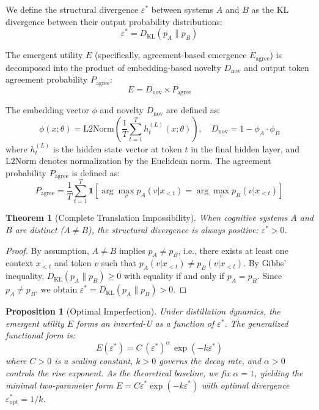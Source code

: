 \documentclass[11pt,a4paper]{article}
\newtheorem{theorem}{Theorem}
\newtheorem{proposition}{Proposition}
\begin{document}
We define the structural divergence $\varepsilon^*$ between systems $A$ and $B$ as the KL
divergence \cite{cover2006} between their output probability distributions:
\[
\varepsilon^* = D_\mathrm{KL}(p_A \| p_B)
\]

The emergent utility $E$ (specifically, agreement-based emergence $E_\mathrm{agree}$) is
decomposed into the product of embedding-based novelty $D_\mathrm{nov}$ and output token
agreement probability $P_\mathrm{agree}$:
\[
E = D_\mathrm{nov} \times P_\mathrm{agree}
\]

The embedding vector $\phi$ and novelty $D_\mathrm{nov}$ are defined as:
\[
\phi(x;\theta) = \mathrm{L2Norm}\!\left(\frac{1}{T}\sum_{t=1}^{T} h_t^{(L)}(x;\theta)\right),
\quad D_\mathrm{nov} = 1 - \phi_A \cdot \phi_B
\]
where $h_t^{(L)}$ is the hidden state vector at token $t$ in the final hidden layer, and
$\mathrm{L2Norm}$ denotes normalization by the Euclidean norm. The agreement probability
$P_\mathrm{agree}$ is defined as:
\[
P_\mathrm{agree} = \frac{1}{T}\sum_{t=1}^{T}
\mathbf{1}\!\left[\arg\max_v p_A(v|x_{<t}) = \arg\max_v p_B(v|x_{<t})\right]
\]

\begin{theorem}[Complete Translation Impossibility]
When cognitive systems $A$ and $B$ are distinct ($A \neq B$), the structural divergence is
always positive: $\varepsilon^* > 0$.
\end{theorem}

\begin{proof}
By assumption, $A \neq B$ implies $p_A \neq p_B$, i.e., there exists at least one context
$x_{<t}$ and token $v$ such that $p_A(v|x_{<t}) \neq p_B(v|x_{<t})$. By Gibbs' inequality,
$D_\mathrm{KL}(p_A \| p_B) \geq 0$ with equality if and only if $p_A = p_B$. Since
$p_A \neq p_B$, we obtain $\varepsilon^* = D_\mathrm{KL}(p_A \| p_B) > 0$.
\end{proof}

\begin{proposition}[Optimal Imperfection]\label{prop:optimal}
Under distillation dynamics, the emergent utility $E$ forms an inverted-U as a function of
$\varepsilon^*$. The generalized functional form is:
\[
E(\varepsilon^*) = C\,(\varepsilon^*)^\alpha\,\exp(-k\varepsilon^*)
\]
where $C > 0$ is a scaling constant, $k > 0$ governs the decay rate, and $\alpha > 0$
controls the rise exponent. As the theoretical baseline, we fix $\alpha = 1$, yielding the
minimal two-parameter form $E = C\varepsilon^*\exp(-k\varepsilon^*)$ with optimal divergence
$\varepsilon^*_\mathrm{opt} = 1/k$.
\end{proposition}
\end{document}
